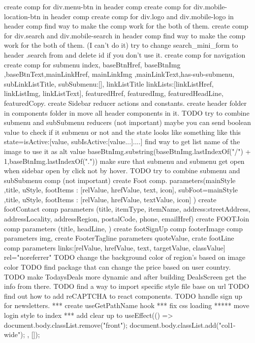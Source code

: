  create comp for div.menu-btn in header comp 
create comp for div.mobile-location-btn in header comp
 create comp for div.logo and div.mobile-logo in header comp
    find way to make the comp work for the both of them.
 create comp for div.search and div.mobile-search in header comp
    find way to make the comp work for the both of them. (I can't do it)
 try to change search_mini_form to header .search from and delete id if you don't use it.
 create comp for navigation 
 create comp for submenu 
   {
      index, baseBtnHref, baseBtnImg ,baseBtnText,mainLinkHref, mainLinkImg ,mainLinkText,has-sub-submenu, subLinkListTitle, subSubmenu:[{}], linkListTitle linkLists:[{linkListHref, linkListImg, linkListText}], featuredHref, featuredImg, featuredHeadLine, featuredCopy.
   }
 create Sidebar reducer actions and constants.
create header folder in components folder in move all header components in it.
TODO try to combine submenu and subSubmenu reducers (not important)
   maybe you can send boolean value to check if it submenu or not and the state looks like something like this 
      state={isActive:[{value, subIsActive:[value...]}....]}
 find way to get list name of the image to use it as alt value
   baseBtnImg.substring(baseBtnImg.lastIndexOf("/") + 1,baseBtnImg.lastIndexOf("."))
  make sure that submenu and submenu get open when sidebar open by click not by hover.
TODO try to combine submenu and subSubmenu comp (not important)
 create Foot comp.
   parameters(mainStyle ,title, uStyle, footItems : [{relValue, hrefValue, text, icon}], subFoot={mainStyle ,title, uStyle, footItems : [{relValue, hrefValue, textValue, icon}]} )
create footContact comp
   parameters (title, itemType, itemName, address:{streetAddress, addressLocality, addressRegion, postalCode}, phone, emailHref)
 create FOOTJoin comp
   parameters (title, headLine, )
 create footSignUp comp
 footerImage comp
   parameters img,
 create FooterTagline 
   parameters quoteValue,
 crate footLine comp
   parameters links:[{relValue, hrefValue, text, targetValue, classValue}] rel="noreferrer"
TODO change the background color of region's based on image color
TODO find package that can change the price based on user country.
TODO make TodaysDeals more dynamic and after building DealsScreen get the info from there.
TODO find a way to import specific style file base on url
TODO find out how to add reCAPTCHA to react components.
TODO handle sign up for newsletters.
*** create useGetPathName hook
 *** fix css loading 
 ***** move login style to index
 *** add clear up to useEffect(() => {
    document.body.classList.remove("front");
    document.body.classList.add("col1-wide");
  }, []);

